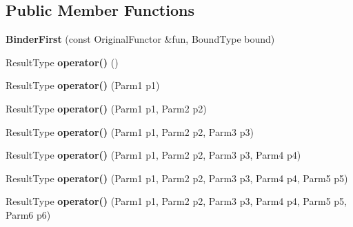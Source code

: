 \subsection*{Public Member Functions}
\begin{DoxyCompactItemize}
\item 
\hypertarget{classLoki_1_1BinderFirst_a243f009a3a4956b675f1851def7281a7}{}{\bfseries Binder\+First} (const Original\+Functor \&fun, Bound\+Type bound)\label{classLoki_1_1BinderFirst_a243f009a3a4956b675f1851def7281a7}

\item 
\hypertarget{classLoki_1_1BinderFirst_a73b876f37994f8f286d637b7aa0b1bff}{}Result\+Type {\bfseries operator()} ()\label{classLoki_1_1BinderFirst_a73b876f37994f8f286d637b7aa0b1bff}

\item 
\hypertarget{classLoki_1_1BinderFirst_a00f871086e6cdd2f5b50d9141e3bd941}{}Result\+Type {\bfseries operator()} (Parm1 p1)\label{classLoki_1_1BinderFirst_a00f871086e6cdd2f5b50d9141e3bd941}

\item 
\hypertarget{classLoki_1_1BinderFirst_a6b572705902ce924ea8024aa4804a387}{}Result\+Type {\bfseries operator()} (Parm1 p1, Parm2 p2)\label{classLoki_1_1BinderFirst_a6b572705902ce924ea8024aa4804a387}

\item 
\hypertarget{classLoki_1_1BinderFirst_ae8b7f11fac3a1d536ac837bf85dd0b04}{}Result\+Type {\bfseries operator()} (Parm1 p1, Parm2 p2, Parm3 p3)\label{classLoki_1_1BinderFirst_ae8b7f11fac3a1d536ac837bf85dd0b04}

\item 
\hypertarget{classLoki_1_1BinderFirst_a10eb621ee09ec0a4d63def4b1c391ed2}{}Result\+Type {\bfseries operator()} (Parm1 p1, Parm2 p2, Parm3 p3, Parm4 p4)\label{classLoki_1_1BinderFirst_a10eb621ee09ec0a4d63def4b1c391ed2}

\item 
\hypertarget{classLoki_1_1BinderFirst_a85abc5853e2f8adc849dc309f406c0c9}{}Result\+Type {\bfseries operator()} (Parm1 p1, Parm2 p2, Parm3 p3, Parm4 p4, Parm5 p5)\label{classLoki_1_1BinderFirst_a85abc5853e2f8adc849dc309f406c0c9}

\item 
\hypertarget{classLoki_1_1BinderFirst_ac106a37925fa2e4570eeeddc9c25b0ca}{}Result\+Type {\bfseries operator()} (Parm1 p1, Parm2 p2, Parm3 p3, Parm4 p4, Parm5 p5, Parm6 p6)\label{classLoki_1_1BinderFirst_ac106a37925fa2e4570eeeddc9c25b0ca}


\end{DoxyCompactItemize}
